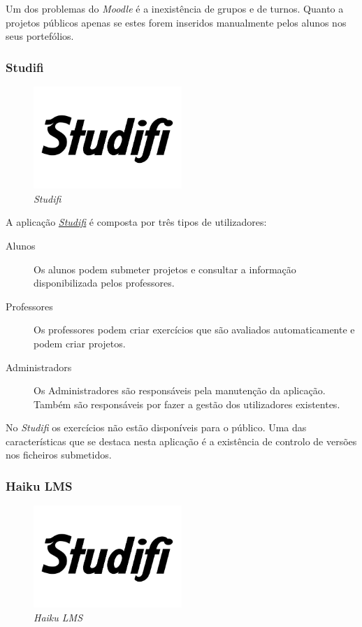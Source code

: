 Um dos problemas do \emph{Moodle} é a inexistência de grupos e de turnos. Quanto a projetos públicos apenas se estes forem inseridos manualmente pelos alunos nos seus portefólios.

\subsubsection{Studifi} %
\label{ssub:studifi}

\begin{figure}[H]
        \centering
        \includegraphics[width=0.5\textwidth]{images/concorrencia/studifi.png}
         \caption{\emph{Studifi}}
         \label{fig: studifi}
\end{figure}

A aplicação \href{https://studifi.com/}{\emph{Studifi}} é composta por três tipos de utilizadores:

\begin{description}
	\item[Alunos] Os alunos podem submeter projetos e consultar a informação disponibilizada pelos professores.
	\item[Professores] Os professores podem criar exercícios que são avaliados automaticamente e podem criar projetos.
	\item[Administradors] Os Administradores são responsáveis pela manutenção da aplicação. Também são responsáveis por fazer a gestão dos utilizadores existentes.
\end{description}

No \emph{Studifi} os exercícios não estão disponíveis para o público. Uma das características que se destaca nesta aplicação é a existência de controlo de versões nos ficheiros submetidos.


\subsubsection{Haiku LMS} %
\label{ssub:haiku_lms}

\begin{figure}[H]
        \centering
        \includegraphics[width=0.5\textwidth]{images/concorrencia/studifi.png}
         \caption{\emph{Haiku LMS}}
         \label{fig: studifi}
\end{figure}

